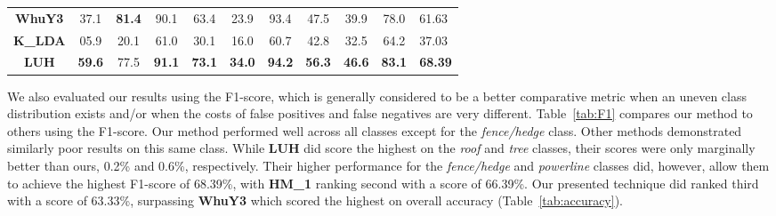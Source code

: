 \documentclass[final,3p,times,twocolumn,authoryear]{elsarticle}
\begin{document}
\begin{table*}[]
\begin{tabular}{c|ccccccccc|l}
\multicolumn{1}{c|}{\textbf{WhuY3}}  & 37.1                                 & {\color[HTML]{FE0000} \textbf{81.4}} & 90.1                                 & 63.4                                 & 23.9                                 & 93.4                                 & 47.5                                 & 39.9                                 & 78.0                                 & 61.63                                 \\
\multicolumn{1}{c|}{\textbf{K\_LDA}} & 05.9                                 & 20.1                                 & 61.0                                 & 30.1                                 & 16.0                                 & 60.7                                 & 42.8                                 & 32.5                                 & 64.2                                 & 37.03                                 \\
\multicolumn{1}{c|}{\textbf{LUH}}    & {\color[HTML]{3531FF} \textbf{59.6}}                                 & 77.5                                 & {\color[HTML]{3531FF} \textbf{91.1}} & {\color[HTML]{3531FF} \textbf{73.1}} & {\color[HTML]{FE0000} \textbf{34.0}} & {\color[HTML]{FE0000} \textbf{94.2}} & {\color[HTML]{FE0000} \textbf{56.3}} & {\color[HTML]{3531FF} \textbf{46.6}} & {\color[HTML]{FE0000} \textbf{83.1}} & {\color[HTML]{FE0000} \textbf{68.39}} \\
\cline{1-11}
\end{tabular}
\end{table*} 

We also evaluated our results using the F1-score, which is generally considered to be a better comparative metric when an uneven class distribution exists and/or when the costs of false positives and false negatives are very different.
Table~\ref{tab:F1} compares our method to others using the F1-score. Our method performed well across all classes except for the {\it fence/hedge} class. Other methods demonstrated similarly poor results on this same class. While {\bf LUH} did score the highest on the {\it roof} and {\it tree} classes, their scores were only marginally better than ours, 0.2\% and 0.6\%, respectively. Their higher performance for the {\it fence/hedge} and {\it powerline} classes did, however, allow them to achieve the highest F1-score of 68.39\%, with {\bf HM\_1} ranking second with a score of 66.39\%. Our presented technique did ranked third with a score of 63.33\%, surpassing {\bf WhuY3} which scored the highest on overall accuracy (Table~\ref{tab:accuracy}).
\end{document}
